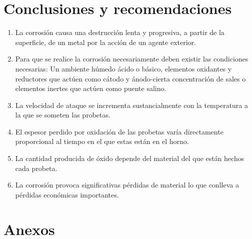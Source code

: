 \documentclass[a4paper,12pt]{report}
\begin{document}
\chapter{Conclusiones y recomendaciones}
\begin{enumerate}
\item La corrosión causa una destrucción lenta y progresiva, a partir de la superficie, de un metal por la acción de un agente exterior.
\item Para que se realice la corrosión necesariamente deben existir las condiciones necesarias: Un ambiente húmedo ácido o básico, elementos oxidantes y reductores que actúen como cátodo y ánodo-cierta concentración de sales o elementos inertes que actúen como puente salino.
\item La velocidad de ataque se incrementa sustancialmente con la temperatura a la que se someten las probetas.
\item El espesor perdido por oxidación de las probetas varía directamente proporcional al tiempo en el que estas están en el horno.
\item La cantidad producida de óxido depende del material del que están hechos cada probeta.
\item La corrosión provoca significativas pérdidas de material lo que conlleva a pérdidas económicas importantes.
\end{enumerate}
\chapter{Anexos}
\end{document}
